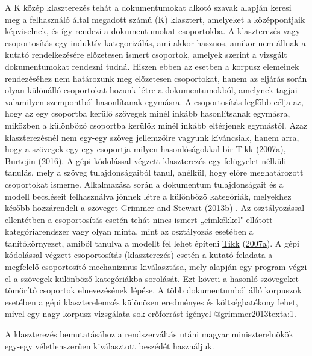 \documentclass[
]{book}
\begin{document}
A K közép klaszterezés tehát a dokumentumokat alkotó szavak alapján
keresi meg a felhasználó által megadott számú (K) klasztert, amelyeket a
középpontjaik képviselnek, és így rendezi a dokumentumokat csoportokba.
A klaszterezés vagy csoportosítás egy induktív kategorizálás, ami akkor
hasznos, amikor nem állnak a kutató rendelkezésére előzetesen ismert
csoportok, amelyek szerint a vizsgált dokumentumokat rendezni tudná.
Hiszen ebben az esetben a korpusz elemeinek rendezéséhez nem határozunk
meg előzetesen csoportokat, hanem az eljárás során olyan különálló
csoportokat hozunk létre a dokumentumokból, amelynek tagjai valamilyen
szempontból hasonlítanak egymásra. A csoportosítás legfőbb célja az,
hogy az egy csoportba kerülő szövegek minél inkább hasonlítsanak
egymásra, miközben a különböző csoportba kerülők minél inkább eltérjenek
egymástól. Azaz klaszterezésnél nem egy-egy szöveg jellemzőire vagyunk
kíváncsiak, hanem arra, hogy a szövegek egy-egy csoportja milyen
hasonlóságokkal bír \protect\hyperlink{ref-tikk2007}{Tikk}
(\protect\hyperlink{ref-tikk2007}{2007a}),
\protect\hyperlink{ref-burtejin2016}{Burtejin}
(\protect\hyperlink{ref-burtejin2016}{2016}). A gépi kódolással végzett
klaszterezés egy felügyelet nélküli tanulás, mely a szöveg
tulajdonságaiból tanul, anélkül, hogy előre meghatározott csoportokat
ismerne. Alkalmazása során a dokumentum tulajdonságait és a modell
becsléseit felhasználva jönnek létre a különböző kategóriák, melyekhez
később hozzárendeli a szöveget
\protect\hyperlink{ref-grimmer2013texta}{Grimmer and Stewart}
(\protect\hyperlink{ref-grimmer2013texta}{2013b}) . Az osztályozással
ellentétben a csoportosítás esetén tehát nincs ismert „címkékkel"
ellátott kategóriarendszer vagy olyan minta, mint az osztályozás
esetében a tanítókörnyezet, amiből tanulva a modellt fel lehet építeni
\protect\hyperlink{ref-tikk2007}{Tikk}
(\protect\hyperlink{ref-tikk2007}{2007a}). A gépi kódolással végzett
csoportosítás (klaszterezés) esetén a kutató feladata a megfelelő
csoportosító mechanizmus kiválasztása, mely alapján egy program végzi el
a szövegek különböző kategóriákba sorolását. Ezt követi a hasonló
szövegeket tömörítő csoportok elnevezésének lépése. A több dokumentumból
álló korpuszok esetében a gépi klaszterelemzés különösen eredményes és
költséghatékony lehet, mivel egy nagy korpusz vizsgálata sok erőforrást
igényel @grimmer2013texta:1.

A klaszterezés bemutatásához a rendszerváltás utáni magyar
miniszterelnökök egy-egy véletlenszerűen kiválasztott beszédét
használjuk.
\end{document}
